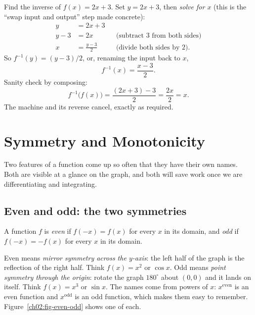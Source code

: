 \begin{example}
\label{ch02:ex-find-inverse}
Find the inverse of $f(x) = 2x + 3$. Set $y = 2x + 3$, then \emph{solve for $x$}
(this is the ``swap input and output'' step made concrete):
\begin{align*}
  y &= 2x + 3 \\
  y - 3 &= 2x && \text{(subtract $3$ from both sides)} \\
  x &= \frac{y - 3}{2} && \text{(divide both sides by $2$).}
\end{align*}
So $f^{-1}(y) = (y-3)/2$, or, renaming the input back to $x$,
\[
  f^{-1}(x) = \frac{x-3}{2}.
\]
Sanity check by composing:
\[
  f^{-1}\bigl(f(x)\bigr) = \frac{(2x+3)-3}{2} = \frac{2x}{2} = x.
\]
The machine and its reverse cancel, exactly as required.
\end{example}

\section{Symmetry and Monotonicity}
\label{ch02:symmetry-monotonicity}

Two features of a function come up so often that they have their own
names. Both are visible at a glance on the graph, and both will save work
once we are differentiating and integrating.

\subsection{Even and odd: the two symmetries}

\begin{definition}
\label{ch02:def-even-odd}
A function $f$ is \emph{even} if $f(-x) = f(x)$ for every $x$ in its domain, and
\emph{odd} if $f(-x) = -f(x)$ for every $x$ in its domain.
\end{definition}

Even means \emph{mirror symmetry across the $y$-axis}: the left half of the graph
is the reflection of the right half. Think $f(x)=x^2$ or $\cos x$. Odd means
\emph{point symmetry through the origin}: rotate the graph $180^\circ$ about
$(0,0)$ and it lands on itself. Think $f(x)=x^3$ or $\sin x$. The names come from
powers of $x$: $x^{\text{even}}$ is an even function and $x^{\text{odd}}$ is an odd
function, which makes them easy to remember. Figure~\ref{ch02:fig-even-odd} shows one of each.

